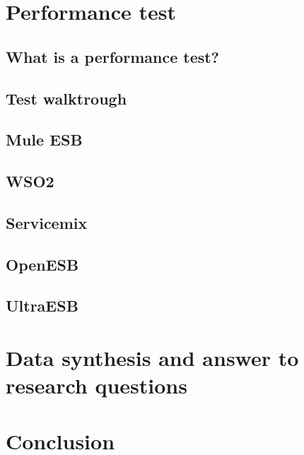 \documentclass{llncs}
\begin{document}
\section{Performance test}
\subsection{What is a performance test?}
\subsection{Test walktrough}
	\subsection{Mule ESB}
	\subsection{WSO2}
	\subsection{Servicemix}
	\subsection{OpenESB}
	\subsection{UltraESB}

\section{Data synthesis and answer to research questions}
\section{Conclusion}



\end{document}
